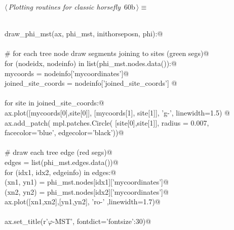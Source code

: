 \documentclass[11.5pt]{report}
\begin{document}
\vspace{-0.8cm} \newchunk 

\begin{flushleft} \small\label{scrap92}\raggedright\small
{} $\langle\,${\itshape Plotting routines for classic horsefly}\nobreak\ {\footnotesize {60b}}$\,\rangle\equiv$
\vspace{-1ex}
\begin{list}{}{} \item
\mbox{}\verb@@\\
\mbox{}\verb@def draw_phi_mst(ax, phi_mst, inithorseposn, phi):@\\
\mbox{}\verb@@\\
\mbox{}\verb@     # for each tree node draw segments joining to sites (green segs)@\\
\mbox{}\verb@     for (nodeidx, nodeinfo) in list(phi_mst.nodes.data()):@\\
\mbox{}\verb@         mycoords           = nodeinfo['mycoordinates']@\\
\mbox{}\verb@         joined_site_coords = nodeinfo['joined_site_coords'] @\\
\mbox{}\verb@@\\
\mbox{}\verb@         for site in joined_site_coords:@\\
\mbox{}\verb@               ax.plot([mycoords[0],site[0]], [mycoords[1], site[1]], 'g-', linewidth=1.5) @\\
\mbox{}\verb@               ax.add_patch( mpl.patches.Circle( [site[0],site[1]], radius = 0.007, \@\\
\mbox{}\verb@                                                 facecolor='blue', edgecolor='black'))@\\
\mbox{}\verb@@\\
\mbox{}\verb@     # draw each tree edge (red segs)@\\
\mbox{}\verb@     edges = list(phi_mst.edges.data())@\\
\mbox{}\verb@     for (idx1, idx2, edgeinfo) in edges:@\\
\mbox{}\verb@          (xn1, yn1) =  phi_mst.nodes[idx1]['mycoordinates']@\\
\mbox{}\verb@          (xn2, yn2) =  phi_mst.nodes[idx2]['mycoordinates']@\\
\mbox{}\verb@          ax.plot([xn1,xn2],[yn1,yn2], 'ro-' ,linewidth=1.7)@\\
\mbox{}\verb@@\\
\mbox{}\verb@     ax.set_title(r'$\varphi$-MST', fontdict={'fontsize':30})@\\

\end{list}
\end{flushleft}
\end{document}
